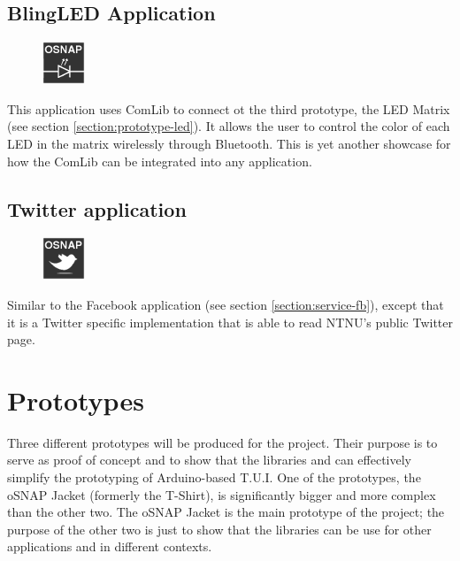 \subsection{BlingLED Application}
\begin{figure}
	\centering \includegraphics[scale=1]{img/app-led}
\end{figure}
This application uses ComLib to connect ot the third prototype, the LED Matrix (see section \ref{section:prototype-led}). It allows the user
to control the color of each LED in the matrix wirelessly through Bluetooth. This is yet another showcase for how the ComLib can be integrated
into any application.

\subsection{Twitter application}
\begin{figure}
	\centering \includegraphics[scale=1]{img/app-twitter}
\end{figure}
Similar to the Facebook application (see section \ref{section:service-fb}),
except that it is a Twitter specific implementation that is able to read NTNU's public Twitter page.

\section{Prototypes}
\label{sec:prototypes}
Three different prototypes will be produced for the project. Their purpose is to serve as proof of concept and
to show that the libraries and can effectively simplify the prototyping of Arduino-based T.U.I.
One of the prototypes, the oSNAP Jacket (formerly the T-Shirt), is significantly bigger and more complex than the other two.
The oSNAP Jacket is the main prototype of the project; the purpose of the other two
is just to show that the libraries can be use for other applications and in different contexts.

